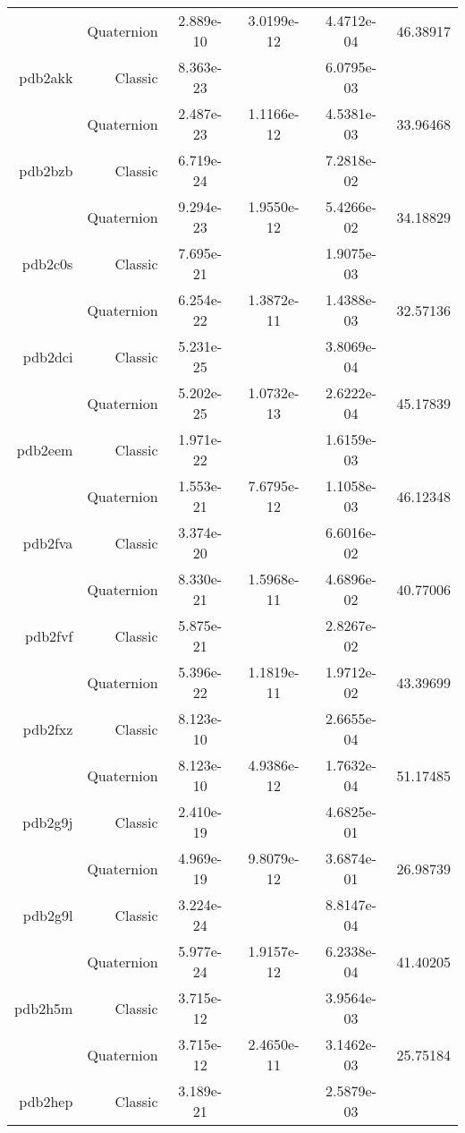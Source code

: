 \begin{xltabular}{\textwidth}{r|rS[table-format=1.3e+2]S[table-format=1.4e+2]S[table-format=1.4e+2]S[table-format=-1.5]}
& Quaternion & 2.889e-10 & 3.0199e-12 & 4.4712e-04 & 46.38917\\  \addlinespace
pdb2akk & Classic & 8.363e-23 &  & 6.0795e-03 & \\
& Quaternion & 2.487e-23 & 1.1166e-12 & 4.5381e-03 & 33.96468\\  \addlinespace
pdb2bzb & Classic & 6.719e-24 &  & 7.2818e-02 & \\
& Quaternion & 9.294e-23 & 1.9550e-12 & 5.4266e-02 & 34.18829\\  \addlinespace
pdb2c0s & Classic & 7.695e-21 &  & 1.9075e-03 & \\
& Quaternion & 6.254e-22 & 1.3872e-11 & 1.4388e-03 & 32.57136\\  \addlinespace
pdb2dci & Classic & 5.231e-25 &  & 3.8069e-04 & \\
& Quaternion & 5.202e-25 & 1.0732e-13 & 2.6222e-04 & 45.17839\\  \addlinespace
pdb2eem & Classic & 1.971e-22 &  & 1.6159e-03 & \\
& Quaternion & 1.553e-21 & 7.6795e-12 & 1.1058e-03 & 46.12348\\  \addlinespace
pdb2fva & Classic & 3.374e-20 &  & 6.6016e-02 & \\
& Quaternion & 8.330e-21 & 1.5968e-11 & 4.6896e-02 & 40.77006\\  \addlinespace
pdb2fvf & Classic & 5.875e-21 &  & 2.8267e-02 & \\
& Quaternion & 5.396e-22 & 1.1819e-11 & 1.9712e-02 & 43.39699\\  \addlinespace
pdb2fxz & Classic & 8.123e-10 &  & 2.6655e-04 & \\
& Quaternion & 8.123e-10 & 4.9386e-12 & 1.7632e-04 & 51.17485\\  \addlinespace
pdb2g9j & Classic & 2.410e-19 &  & 4.6825e-01 & \\
& Quaternion & 4.969e-19 & 9.8079e-12 & 3.6874e-01 & 26.98739\\  \addlinespace
pdb2g9l & Classic & 3.224e-24 &  & 8.8147e-04 & \\
& Quaternion & 5.977e-24 & 1.9157e-12 & 6.2338e-04 & 41.40205\\  \addlinespace
pdb2h5m & Classic & 3.715e-12 &  & 3.9564e-03 & \\
& Quaternion & 3.715e-12 & 2.4650e-11 & 3.1462e-03 & 25.75184\\  \addlinespace
pdb2hep & Classic & 3.189e-21 &  & 2.5879e-03 & \\

\end{xltabular}
